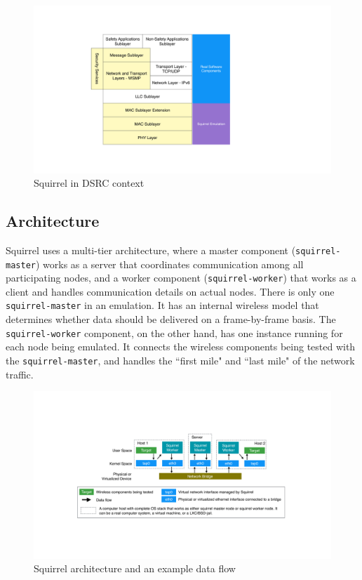 \documentclass[12pt]{report}
\begin{document}
\begin{figure}[h]
  \begin{center}
    \includegraphics[width=.7\textwidth]{figures/squirrelDSRC.pdf}
    \caption{\label{fig:squirrel_dsrc}Squirrel in DSRC context}
  \end{center}
\end{figure}

\subsection{Architecture}
Squirrel uses a multi-tier architecture, where a master component (\texttt{squirrel-master}) works as a server that coordinates communication among all participating nodes, and a worker component (\texttt{squirrel-worker}) that works as a client and handles communication details on actual nodes. There is only one \texttt{squirrel-master} in an emulation. It has an internal wireless model that determines whether data should be delivered on a frame-by-frame basis. The \texttt{squirrel-worker} component, on the other hand, has one instance running for each node being emulated. It connects the wireless components being tested with the \texttt{squirrel-master}, and handles the ``first mile" and ``last mile" of the network traffic.

\begin{figure}[h]
  \begin{center}
    \includegraphics[width=\textwidth]{figures/squirrelArch.pdf}
    \caption{\label{fig:squirrel_arch}Squirrel architecture and an example data flow}
  \end{center}
\end{figure}
\end{document}
